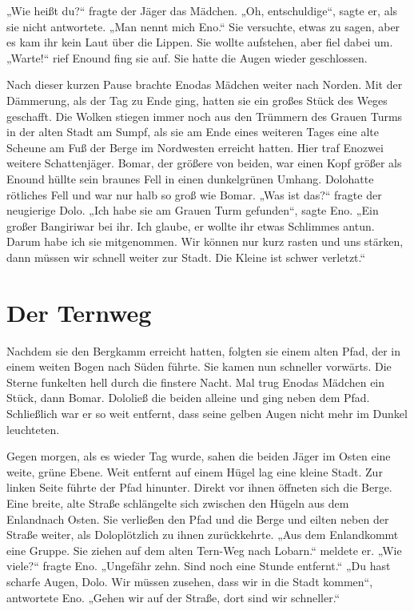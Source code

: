 \documentclass[12pt,a4paper,onecolumn,twoside,ngerman]{book}
\newcommand{\Tern}{Tern}
\newcommand{\Bangiri}{Bangiri}
\newcommand{\Enland}{Enland}
\newcommand{\Eno}{Eno}
\newcommand{\Bomar}{Bomar}
\newcommand{\Do}{Dolo}
\newcommand{\Lobarn}{Lobarn}
\begin{document}
„Wie heißt du?“ fragte der Jäger das Mädchen. „Oh, entschuldige“, sagte er, als sie nicht antwortete. „Man nennt mich \Eno.“ Sie versuchte, etwas zu sagen, aber es kam ihr kein Laut über die Lippen. Sie wollte aufstehen, aber fiel dabei um. „Warte!“ rief \Eno und fing sie auf. Sie hatte die Augen wieder geschlossen.

Nach dieser kurzen Pause brachte \Eno das Mädchen weiter nach Norden. Mit der Dämmerung, als der Tag zu Ende ging, hatten sie ein großes Stück des Weges geschafft. Die Wolken stiegen immer noch aus den Trümmern des Grauen Turms in der alten Stadt am Sumpf, als sie am Ende eines weiteren Tages eine alte Scheune am Fuß der Berge im Nordwesten erreicht hatten. Hier traf \Eno zwei weitere Schattenjäger. \Bomar, der größere von beiden, war einen Kopf größer als \Eno und hüllte sein braunes Fell in einen dunkelgrünen Umhang. \Do hatte rötliches Fell und war nur halb so groß wie \Bomar. 
„Was ist das?“ fragte der neugierige \Do. 
„Ich habe sie am Grauen Turm gefunden“, sagte \Eno. „Ein großer \Bangiri war bei ihr. Ich glaube, er wollte ihr etwas Schlimmes antun. Darum habe ich sie mitgenommen. Wir können nur kurz rasten und uns stärken, dann müssen wir schnell weiter zur Stadt. Die Kleine ist schwer verletzt.“

\section{Der Ternweg}
Nachdem sie den Bergkamm erreicht hatten, folgten sie einem alten Pfad, der in einem weiten Bogen nach Süden führte. Sie kamen nun schneller vorwärts. Die Sterne funkelten hell durch die finstere Nacht. Mal trug \Eno das Mädchen ein Stück, dann \Bomar. \Do ließ die beiden alleine und ging neben dem Pfad. Schließlich war er so weit entfernt, dass seine gelben Augen nicht mehr im Dunkel leuchteten.

Gegen morgen, als es wieder Tag wurde, sahen die beiden Jäger im Osten eine weite, grüne Ebene. Weit entfernt auf einem Hügel lag eine kleine Stadt. Zur linken Seite führte der Pfad hinunter. Direkt vor ihnen öffneten sich die Berge. Eine breite, alte Straße schlängelte sich zwischen den Hügeln aus dem \Enland nach Osten. Sie verließen den Pfad und die Berge und eilten neben der Straße weiter, als \Do plötzlich zu ihnen zurückkehrte. „Aus dem \Enland kommt eine Gruppe. Sie ziehen auf dem alten \Tern{-Weg} nach \Lobarn.“ meldete er. „Wie viele?“ fragte \Eno. „Ungefähr zehn. Sind noch eine Stunde entfernt.“ „Du hast scharfe Augen, \Do. Wir müssen zusehen, dass wir in die Stadt kommen“, antwortete \Eno. „Gehen wir auf der Straße, dort sind wir schneller.“
\end{document}
